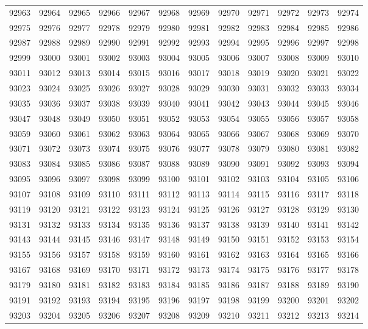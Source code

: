 \begin{center}
\begin{longtable}{llllllllllll}
92963 &92964 &92965 &92966 &92967 &92968 &92969 &92970 &92971 &92972 &92973 &92974 \\
92975 &92976 &92977 &92978 &92979 &92980 &92981 &92982 &92983 &92984 &92985 &92986 \\
92987 &92988 &92989 &92990 &92991 &92992 &92993 &92994 &92995 &92996 &92997 &92998 \\
92999 &93000 &93001 &93002 &93003 &93004 &93005 &93006 &93007 &93008 &93009 &93010 \\
93011 &93012 &93013 &93014 &93015 &93016 &93017 &93018 &93019 &93020 &93021 &93022 \\
93023 &93024 &93025 &93026 &93027 &93028 &93029 &93030 &93031 &93032 &93033 &93034 \\
93035 &93036 &93037 &93038 &93039 &93040 &93041 &93042 &93043 &93044 &93045 &93046 \\
93047 &93048 &93049 &93050 &93051 &93052 &93053 &93054 &93055 &93056 &93057 &93058 \\
93059 &93060 &93061 &93062 &93063 &93064 &93065 &93066 &93067 &93068 &93069 &93070 \\
93071 &93072 &93073 &93074 &93075 &93076 &93077 &93078 &93079 &93080 &93081 &93082 \\
93083 &93084 &93085 &93086 &93087 &93088 &93089 &93090 &93091 &93092 &93093 &93094 \\
93095 &93096 &93097 &93098 &93099 &93100 &93101 &93102 &93103 &93104 &93105 &93106 \\
93107 &93108 &93109 &93110 &93111 &93112 &93113 &93114 &93115 &93116 &93117 &93118 \\
93119 &93120 &93121 &93122 &93123 &93124 &93125 &93126 &93127 &93128 &93129 &93130 \\
93131 &93132 &93133 &93134 &93135 &93136 &93137 &93138 &93139 &93140 &93141 &93142 \\
93143 &93144 &93145 &93146 &93147 &93148 &93149 &93150 &93151 &93152 &93153 &93154 \\
93155 &93156 &93157 &93158 &93159 &93160 &93161 &93162 &93163 &93164 &93165 &93166 \\
93167 &93168 &93169 &93170 &93171 &93172 &93173 &93174 &93175 &93176 &93177 &93178 \\
93179 &93180 &93181 &93182 &93183 &93184 &93185 &93186 &93187 &93188 &93189 &93190 \\
93191 &93192 &93193 &93194 &93195 &93196 &93197 &93198 &93199 &93200 &93201 &93202 \\
93203 &93204 &93205 &93206 &93207 &93208 &93209 &93210 &93211 &93212 &93213 &93214 \\

\end{longtable}
\end{center}
